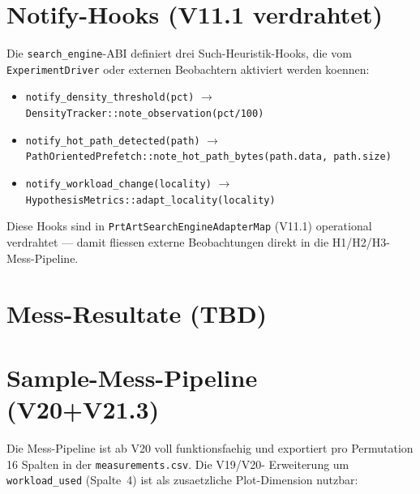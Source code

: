 \section{Notify-Hooks (V11.1 verdrahtet)}

Die \texttt{search\_engine}-ABI definiert drei
Such-Heuristik-Hooks, die vom \texttt{ExperimentDriver} oder externen
Beobachtern aktiviert werden koennen:

\begin{itemize}
    \item \texttt{notify\_density\_threshold(pct)} $\to$
          \texttt{DensityTracker::note\_observation(pct/100)}
    \item \texttt{notify\_hot\_path\_detected(path)} $\to$
          \texttt{PathOrientedPrefetch::note\_hot\_path\_bytes(path.data,
          path.size)}
    \item \texttt{notify\_workload\_change(locality)} $\to$
          \texttt{HypothesisMetrics::adapt\_locality(locality)}
\end{itemize}

Diese Hooks sind in \texttt{PrtArtSearchEngineAdapterMap} (V11.1)
operational verdrahtet --- damit fliessen externe Beobachtungen direkt
in die H1/H2/H3-Mess-Pipeline.

\section{Mess-Resultate (TBD)}

%
% 
% 
%
% 

\section{Sample-Mess-Pipeline (V20+V21.3)}

Die Mess-Pipeline ist ab V20 voll funktionsfaehig und exportiert pro
Permutation 16 Spalten in der \texttt{measurements.csv}. Die V19/V20-
Erweiterung um \texttt{workload\_used} (Spalte~4) ist als zusaetzliche
Plot-Dimension nutzbar:

